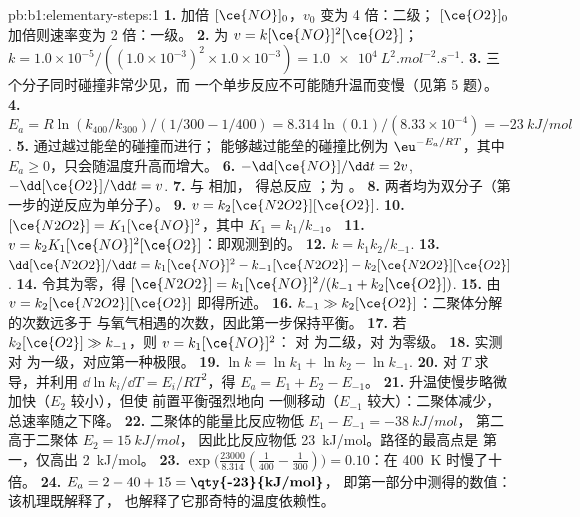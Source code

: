 \begin{solution}{pb:b1:elementary-steps:1}
\textbf{1.} 加倍 $[\ce{NO}]_0$，$v_0$ 变为 4 倍：二级；
$[\ce{O2}]_0$ 加倍则速率变为 2 倍：一级。
\textbf{2.} 为 $v = k[\ce{NO}]^2[\ce{O2}]$；$k = 1.0 \times 10^{-5}/((1.0
\times 10^{-3})^2 \times 1.0 \times 10^{-3}) =
\qty{1.0e4}{L^2.mol^{-2}.s^{-1}}$.
\textbf{3.} 三个分子同时碰撞非常少见，而
一个单步反应不可能随升温而变慢（见第 5 题）。
\textbf{4.} $E_a = R\ln(k_{400}/k_{300})/(1/300 - 1/400) = 8.314 \ln(0.1)
/(8.33 \times 10^{-4}) = \qty{-23}{kJ/mol}$.
\textbf{5.} 通过越过能垒的碰撞而进行；
能够越过能垒的碰撞比例为 $\eu^{-E_a/RT}$，其中 $E_a \ge
0$，只会随温度升高而增大。
\textbf{6.} $-\dd[\ce{NO}]/\dd t = 2v$, $-\dd[\ce{O2}]/\dd t = v$.
\textbf{7.}  与  相加，
得总反应 ；为 。
\textbf{8.} 两者均为双分子（第一步的逆反应为单分子）。
\textbf{9.} $v = k_2[\ce{N2O2}][\ce{O2}]$.
\textbf{10.} $[\ce{N2O2}] = K_1[\ce{NO}]^2$，其中 $K_1 = k_1/k_{-1}$。
\textbf{11.} $v = k_2K_1[\ce{NO}]^2[\ce{O2}]$：即观测到的。
\textbf{12.} $k = k_1k_2/k_{-1}$.
\textbf{13.} $\dd[\ce{N2O2}]/\dd t = k_1[\ce{NO}]^2 - k_{-1}[\ce{N2O2}] -
k_2[\ce{N2O2}][\ce{O2}]$.
\textbf{14.} 令其为零，得 $[\ce{N2O2}] = k_1[\ce{NO}]^2/(k_{-1} +
k_2[\ce{O2}])$.
\textbf{15.} 由 $v = k_2[\ce{N2O2}][\ce{O2}]$ 即得所述。
\textbf{16.} $k_{-1} \gg k_2[\ce{O2}]$：二聚体分解的次数远多于
与氧气相遇的次数，因此第一步保持平衡。
\textbf{17.} 若 $k_2[\ce{O2}] \gg k_{-1}$，则 $v = k_1[\ce{NO}]^2$：
对  为二级，对  为零级。
\textbf{18.} 实测对  为一级，对应第一种极限。
\textbf{19.} $\ln k = \ln k_1 + \ln k_2 - \ln k_{-1}$.
\textbf{20.} 对 $T$ 求导，并利用 $\dd\ln k_i/\dd T
= E_i/RT^2$，得 $E_a = E_1 + E_2 - E_{-1}$。
\textbf{21.} 升温使慢步略微加快（$E_2$ 较小），但使
前置平衡强烈地向  一侧移动（$E_{-1}$ 较大）：二聚体减少，
总速率随之下降。
\textbf{22.} 二聚体的能量比反应物低 $E_1 - E_{-1} = \qty{-38}{kJ/mol}$，
第二高于二聚体 $E_2 = \qty{15}{kJ/mol}$，
因此比反应物低 \qty{23}{kJ/mol}。路径的最高点是
第一，仅高出 \qty{2}{kJ/mol}。
\textbf{23.} $\exp\big(\frac{23000}{8.314}(\frac{1}{400} - \frac{1}{300})\big)
= 0.10$：在 \qty{400}{K} 时慢了十倍。
\textbf{24.} $E_a = 2 - 40 + 15 = \textbf{\qty{-23}{kJ/mol}}$，
即第一部分中测得的数值：该机理既解释了，
也解释了它那奇特的温度依赖性。
\end{solution}
